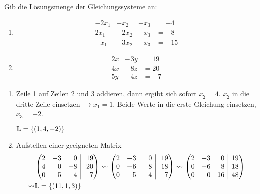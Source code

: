 Gib die Lösungsmenge der Gleichungssysteme an:
\begin{multicols}{2}
	\begin{enumerate}
		\item\begin{alignat*}{4}%
			-2x_1& -x_2& - x_3& = -4\\
			2x_1& +2x_2 & + x_3& = -8\\
			-x_1& -3x_2 & + x_3& =-15
		\end{alignat*}
		\item\begin{alignat*}{4}%
			2x&-3y&=19\\
			4x&-8z&=20\\
			5y&-4z&=-7
		\end{alignat*}
	\end{enumerate}
\end{multicols}
\begin{lsg}{}
\begin{enumerate}
	\item Zeile 1 auf Zeilen 2 und 3 addieren, dann ergibt sich sofort $x_2=4$. $x_2$ in die dritte Zeile einsetzen $\rightarrow x_1=1$. Beide Werte in die erste Gleichung einsetzen, $x_3=-2$.

	$\mathbb{L}=\left\{ (1,4,-2) \right\}$
	\item Aufstellen einer geeigneten Matrix
	\begin{align*}
		&\ematrix{rrr|r}{2&-3&0&19\\4&0&-8&20\\0&5&-4&-7}
		\rightsquigarrow\ematrix{rrr|r}{2&-3&0&19\\0&-6&8&18\\0&5&-4&-7}\rightsquigarrow\ematrix{rrr|r}{2&-3&0&19\\0&-6&8&18\\0&0&16&48}\\
		\rightsquigarrow&\mathbb{L}=\simpleset{(11,1,3)}
	\end{align*}
\end{enumerate}
\end{lsg}


